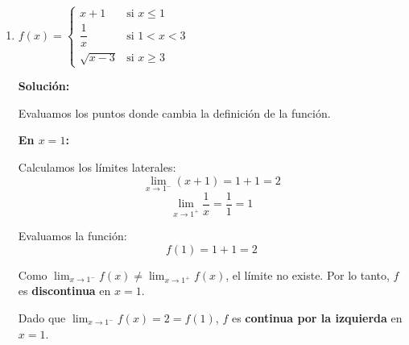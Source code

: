 \documentclass[12pt]{article}
\newcommand{\solucion}{%
    \vspace{0.8em}%
    \textbf{Solución:}%
}
\begin{document}
\begin{enumerate}[label=\alph*)]
\begin{figure}[H]
    \caption{Gráfica de $f(x) = \begin{cases} 1 + x^2 & \text{si } x \leq 0 \\ 2 - x & \text{si } 0 < x \leq 2 \\ (x-2)^2 & \text{si } x > 2 \end{cases}$ con discontinuidad en $x=0$}
    \label{fig:funcion_13a}
    \end{figure}

    \newpage
    \item $f(x) = \begin{cases} x + 1 & \text{si } x \leq 1 \\ \dfrac{1}{x} & \text{si } 1 < x < 3 \\ \sqrt{x - 3} & \text{si } x \geq 3 \end{cases}$

    \solucion

    Evaluamos los puntos donde cambia la definición de la función.

    \textbf{En $x = 1$:}

    Calculamos los límites laterales:
    \[
    \lim_{x \to 1^-} (x + 1) = 1 + 1 = 2
    \]
    \[
    \lim_{x \to 1^+} \frac{1}{x} = \frac{1}{1} = 1
    \]

    Evaluamos la función:
    \[
    f(1) = 1 + 1 = 2
    \]

    Como $\displaystyle\lim_{x \to 1^-} f(x) \neq \lim_{x \to 1^+} f(x)$, el límite no existe. Por lo tanto, $f$ es \textbf{discontinua} en $x = 1$.

    Dado que $\displaystyle\lim_{x \to 1^-} f(x) = 2 = f(1)$, $f$ es \textbf{continua por la izquierda} en $x = 1$.


\end{enumerate}
\end{document}
